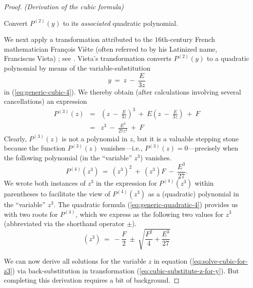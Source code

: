\begin{proof} {\it (Derivation of the cubic formula)}
\medskip

 Convert $P^{(2)}(y)$ to its {\em associated}
quadratic polynomial.

\noindent
We next apply a transformation attributed to the $16$th-century French
mathematician Fran\c{c}ois Vi\`{e}te 
(often referred to by his Latinized name, Franciscus Vieta)
; see \cite{Hazewinkel}.  Vieta's
transformation converts $P^{(2)}(y)$ to a quadratic polynomial by means
of the variable-substitution
\begin{equation}
\label{eq:cubic-substitute-z-for-y}
y \ = \ z \ - \ \frac{E}{3z}
\end{equation}
in (\ref{eq:generic-cubic-4}).  We thereby obtain (after calculations
involving several cancellations) an expression
\begin{eqnarray}
\nonumber
P^{(3)}(z) & = & \left( z \ - \ \frac{E}{3z} \right)^3
\ + \ E \left(z \ - \ \frac{E}{3z} \right) \ + \ F \\
\label{eq:generic-cubic-5}
  & = &
z^3 \ - \ \frac{E^3}{27z^3}  \ + \ F
\end{eqnarray}
Clearly, $P^{(3)}(z)$ is not a polynomial in $z$, but it is a valuable
stepping stone because the function $P^{(3)}(z)$ vanishes---i.e.,
$P^{(3)}(z) = 0$---precisely when the following polynomial (in the
``variable'' $z^3$) vanishes.
\[ P^{(4)}(z^3) \ = \ (z^3)^2 \ + \ (z^3) F \ - \ \frac{E^3}{27}. \]
We wrote both instances of $z^3$ in the expression for $P^{(4)}(z^3)$
within parentheses to facilitate the view of $P^{(4)}(z^3)$ as a
(quadratic) polynomial in the ``variable'' $z^3$.  The quadratic
formula (\ref{eq:generic-quadratic-4}) provides us with two roots for
$P^{(4)}$, which we express as the following two values for $z^3$
(abbreviated via the shorthand operator $\pm$).
\begin{equation}
\label{eq:solve-cubic-for-z3}
(z^3) \ = \
- \frac{F}{2} \ \pm \ \sqrt{\frac{F^2}{4} + \frac{E^3}{27}}
\end{equation}

We can now derive all solutions for the variable $z$ in equation
(\ref{eq:solve-cubic-for-z3}) via back-substitution in transformation
(\ref{eq:cubic-substitute-z-for-y}).  But completing this derivation
requires a bit of background.


\end{proof}

